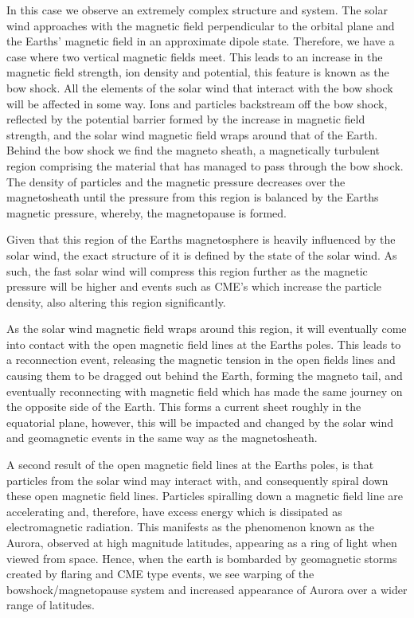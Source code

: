 In this case we observe an extremely complex structure and system.
The solar wind approaches with the magnetic field perpendicular to the orbital plane and the Earths' magnetic field in an approximate dipole state.
Therefore, we have a case where two vertical magnetic fields meet.
This leads to an increase in the magnetic field strength, ion density and potential, this feature is known as the bow shock.
All the elements of the solar wind that interact with the bow shock will be affected in some way.
Ions and particles backstream off the bow shock, reflected by the potential barrier formed by the increase in magnetic field strength, and the solar wind magnetic field wraps around that of the Earth.
Behind the bow shock we find the magneto sheath, a magnetically turbulent region comprising the 
material that has managed to pass through the bow shock.
The density of particles and the magnetic pressure decreases over the magnetosheath until the pressure from this region is balanced by the Earths magnetic pressure, whereby, the magnetopause is formed.

Given that this region of the Earths magnetosphere is heavily influenced by the solar wind, the exact structure of it is defined by the state of the solar wind.
As such, the fast solar wind will compress this region further as the magnetic pressure will be higher and events such as CME's which increase the particle density, also altering this region significantly.

As the solar wind magnetic field wraps around this region, it will eventually come into contact with the open magnetic field lines at the Earths poles.
This leads to a reconnection event, releasing the magnetic tension in the open fields lines and causing them to be dragged out behind the Earth, forming the magneto tail, and eventually reconnecting with magnetic field which has made the same journey on the opposite side of the Earth. 
This forms a current sheet roughly in the equatorial plane, however, this will be impacted and changed by the solar wind and geomagnetic events in the same way as the magnetosheath.

A second result of the open magnetic field lines at the Earths poles, is that particles from the solar wind may interact with, and consequently spiral down these open magnetic field lines.
Particles spiralling down a magnetic field line are accelerating and, therefore, have excess energy which is dissipated as electromagnetic radiation.
This manifests as the phenomenon known as the Aurora, observed at high magnitude latitudes, appearing as a ring of light when viewed from space.
Hence, when the earth is bombarded by geomagnetic storms created by flaring and CME type events, we see warping of the bowshock/magnetopause system and increased appearance of Aurora over a wider range of latitudes.


